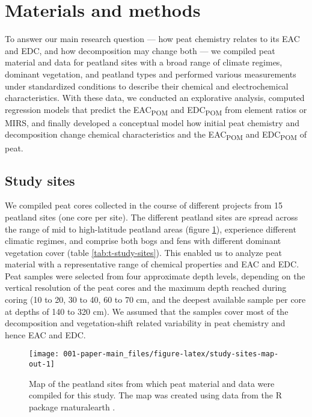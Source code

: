 \documentclass[draft,linenumbers]{agujournal2018}
\begin{document}
\section{Materials and methods}

To answer our main research question --- how peat chemistry relates to
its EAC and EDC, and how decomposition may change both --- we compiled
peat material and data for peatland sites with a broad range of climate
regimes, dominant vegetation, and peatland types and performed various
measurements under standardized conditions to describe their chemical
and electrochemical characteristics. With these data, we conducted an
explorative analysis, computed regression models that predict the
EAC\textsubscript{POM} and EDC\textsubscript{POM} from element ratios or
MIRS, and finally developed a conceptual model how initial peat
chemistry and decomposition change chemical characteristics and the
EAC\textsubscript{POM} and EDC\textsubscript{POM} of peat.

\subsection{Study sites}

We compiled peat cores collected in the course of different projects
from 15 peatland sites (one core per site). The different peatland sites
are spread across the range of mid to high-latitude peatland areas
(figure \ref{fig:study-sites-map-out}), experience different climatic
regimes, and comprise both bogs and fens with different dominant
vegetation cover (table \ref{tab:t-study-sites}). This enabled us to
analyze peat material with a representative range of chemical properties
and EAC and EDC.\\
Peat samples were selected from four approximate depth levels, depending
on the vertical resolution of the peat cores and the maximum depth
reached during coring (10 to 20, 30 to 40, 60 to 70 cm, and the deepest
available sample per core at depths of 140 to 320 cm). We assumed that
the samples cover most of the decomposition and vegetation-shift related
variability in peat chemistry and hence EAC and EDC.

\begin{figure}[H]

{\centering \texttt{[image: 001-paper-main\_files/figure-latex/study-sites-map-out-1]} 

}

\caption{Map of the peatland sites from which peat material and data were compiled for this study. The map was created using data from the R package rnaturalearth \citep{South.2017}.}\label{fig:study-sites-map-out}
\end{figure}
\end{document}
